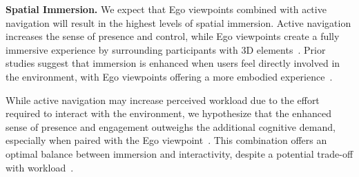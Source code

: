\textbf{Spatial Immersion.} 
We expect that Ego viewpoints combined with active navigation will result in the highest levels of spatial immersion. Active navigation increases the sense of presence and control, while Ego viewpoints create a fully immersive experience by surrounding participants with 3D elements~\cite{slater2009place}. Prior studies suggest that immersion is enhanced when users feel directly involved in the environment, with Ego viewpoints offering a more embodied experience~\cite{cummings2016immersive}.

While active navigation may increase perceived workload due to the effort required to interact with the environment, we hypothesize that the enhanced sense of presence and engagement outweighs the additional cognitive demand, especially when paired with the Ego viewpoint~\cite{hart1988development}. This combination offers an optimal balance between immersion and interactivity, despite a potential trade-off with workload~\cite{servotte2020vr}.